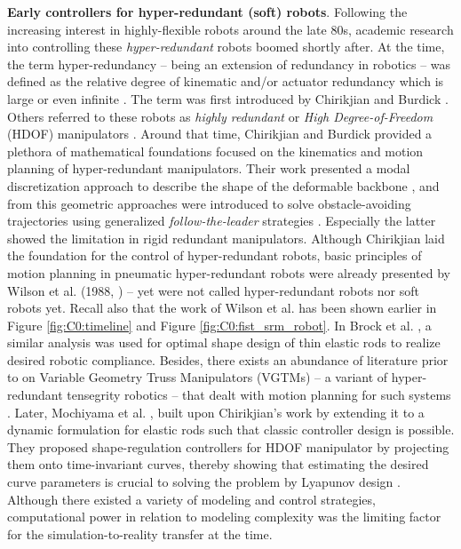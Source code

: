 \par \textbf{Early controllers for hyper-redundant (soft) robots}. Following the increasing interest in highly-flexible robots around the late 80s, academic research into controlling these \textit{hyper-redundant} robots boomed shortly after. At the time, the term hyper-redundancy -- being an extension of redundancy in robotics \cite{MerriamWebster1983} -- was defined as the relative degree of kinematic and/or actuator redundancy which is large or even infinite \cite{Chirikjian1992, Chirikjian1994}. The term was first introduced by Chirikjian and Burdick \cite{Chirikjian1989}. Others referred to these robots as \textit{highly redundant} \cite{Wilson1988Dec, Naccarato1989Dec} or \textit{High Degree-of-Freedom} (HDOF) manipulators \cite{Salerno1989Jan, Mochiyama1999}. Around that time, Chirikjian and Burdick provided a plethora of mathematical foundations \cite{Chirikjian1994, Chirikjian1994Jun, Chirikjian1991, Chirikjian1992, Chirikjian1992Dec} focused on the kinematics and motion planning of hyper-redundant manipulators. Their work presented a modal discretization approach to describe the shape of the deformable backbone \cite{Chirikjian1994Jun}, and from this geometric approaches were introduced to solve obstacle-avoiding trajectories using generalized \textit{follow-the-leader} strategies \cite{Chirikjian1992Dec}. Especially the latter showed the limitation in rigid redundant manipulators. Although Chirikjian laid the foundation for the control of hyper-redundant robots, basic principles of motion planning in pneumatic hyper-redundant robots were already presented by Wilson et al. (1988, \cite{Wilson1988Dec, Wilson1989Jun}) -- yet were not called hyper-redundant robots nor soft robots yet. Recall also that the work of Wilson et al. has been shown earlier in Figure \ref{fig:C0:timeline} and Figure \ref{fig:C0:fist_srm_robot}. In Brock et al. \cite{Brock1991}, a similar analysis was used for optimal shape design of thin elastic rods to realize desired robotic compliance. Besides, there exists an abundance of literature prior to \cite{Chirikjian1992} on Variable Geometry Truss Manipulators (VGTMs) -- a variant of hyper-redundant tensegrity robotics -- that dealt with motion planning for such systems \cite{Naccarato1989Dec, Naccarato1991Apr, Salerno1989Jan}. Later, Mochiyama et al. \cite{Mochiyama1998, Mochiyama1999}, built upon Chirikjian's work by extending it to a dynamic formulation for elastic rods such that classic controller design is possible. They proposed shape-regulation controllers for HDOF manipulator by projecting them onto time-invariant curves, thereby showing that estimating the desired curve parameters is crucial to solving the problem by Lyapunov design \cite{Mochiyama1998}. Although there existed a variety of modeling and control strategies, computational power in relation to modeling complexity was the limiting factor for the simulation-to-reality transfer at the time.